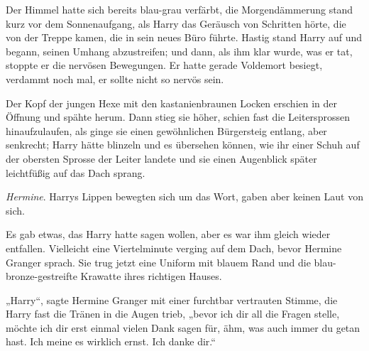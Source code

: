 Der Himmel hatte sich bereits blau-grau verfärbt, die Morgendämmerung stand kurz vor dem Sonnenaufgang, als Harry das Geräusch von Schritten hörte, die von der Treppe kamen, die in sein neues Büro führte. Hastig stand Harry auf und begann, seinen Umhang abzustreifen; und dann, als ihm klar wurde, was er tat, stoppte er die nervösen Bewegungen. Er hatte gerade Voldemort besiegt, verdammt noch mal, er sollte nicht so nervös sein.

Der Kopf der jungen Hexe mit den kastanienbraunen Locken erschien in der Öffnung und spähte herum. Dann stieg sie höher, schien fast die Leitersprossen hinaufzulaufen, als ginge sie einen gewöhnlichen Bürgersteig entlang, aber senkrecht; Harry hätte blinzeln und es übersehen können, wie ihr einer Schuh auf der obersten Sprosse der Leiter landete und sie einen Augenblick später leichtfüßig auf das Dach sprang.

\emph{Hermine}.
Harrys Lippen bewegten sich um das Wort, gaben aber keinen Laut von sich.

Es gab etwas, das Harry hatte sagen wollen, aber es war ihm gleich wieder entfallen. Vielleicht eine Viertelminute verging auf dem Dach, bevor Hermine Granger sprach. Sie trug jetzt eine Uniform mit blauem Rand und die blau-bronze-gestreifte Krawatte ihres richtigen Hauses.

„Harry“, sagte Hermine Granger mit einer furchtbar vertrauten Stimme, die Harry fast die Tränen in die Augen trieb, „bevor ich dir all die Fragen stelle, möchte ich dir erst einmal vielen Dank sagen für, ähm, was auch immer du getan hast. Ich meine es wirklich ernst. Ich danke dir.“

